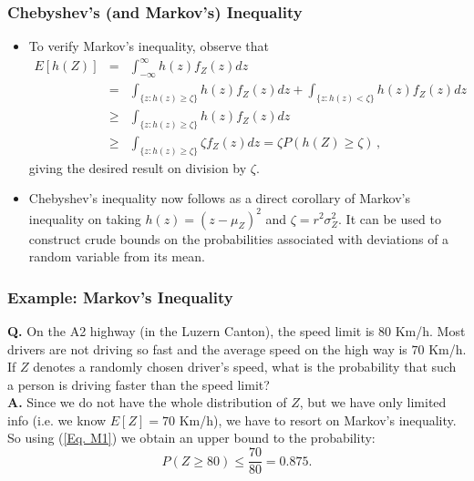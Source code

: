 \documentclass[notes=show,smaller,handout]{beamer}
\renewcommand{\Pr}{P}
\newenvironment{stepitemize}{\begin{itemize}[<+->]}{\end{itemize} }
\begin{document}
\begin{frame}%

\frametitle{Chebyshev's (and Markov's) Inequality}

\begin{stepitemize}
\item To verify Markov's inequality, observe that
\begin{eqnarray*}
E[h( Z)]&=&\int_{-\infty }^{\infty }h(z) f_{Z}\left(z\right)dz\\
&=&\int_{\{z:h(z)\geq\zeta\}}h(z) f_{Z}\left(z\right) dz+
\int_{\{z:h(z)<\zeta\}}h(z) f_{Z}\left(z\right) dz \\
&\geq&\int_{\{z:h(z)\geq\zeta\}}h(z) f_{Z}\left(z\right) dz\\
&\geq&\int_{\{z:h(z)\geq\zeta\}}\zeta f_{Z}\left(z\right)dz=\zeta\Pr(h(Z)\geq\zeta)\,,
\end{eqnarray*}
giving the desired result on division by $\zeta$.
\item Chebyshev's inequality now follows as a direct corollary of Markov's inequality on taking $h(z)=(z-\mu_Z)^2$ and $\zeta=r^2\sigma_Z^2$.
It can be used to construct crude bounds on the probabilities associated with deviations of a random variable from its mean. 

\end{stepitemize}

\end{frame}%

\begin{frame}%

\frametitle{Example: Markov's Inequality}

\begin{example}

\textbf{Q.} On the A2 highway (in the Luzern Canton), the speed limit is $80$ Km/h. Most drivers are not driving so fast and the average speed on the high way is $70$ Km/h. 
If $Z$ denotes a randomly chosen driver's speed, what is the probability that such a person is driving faster than the speed limit? \\
\vspace{1cm}
\textbf{A.} Since we do not have the whole distribution of $Z$, but we have only limited info (i.e. we know $E[Z]=70$ Km/h), we have to resort on Markov's inequality. So using (\ref{Eq. M1}) we obtain an upper bound to the probability:
$$
P(Z \geq 80) \leq \frac{70}{80} = 0.875. 
$$


\end{example}
\end{frame}%
\end{document}
